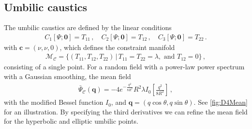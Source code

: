 \documentclass[a4paper, 11pt]{article}
\begin{document}
\subsection{Umbilic caustics}
The umbilic caustics are defined by the linear conditions 
\begin{align}
C_1[\Psi;\bm{0}] = T_{11}\,,\quad
C_2[\Psi;\bm{0}] = T_{12}\,,\quad
C_3[\Psi;\bm{0}] = T_{22}\,.
\end{align}
with $\bm{c}=(\nu,\nu,0)$, which defines the constraint manifold 
\begin{align}
\mathcal{M}_{\mathcal{C}} = \{(T_{11},T_{12},T_{22})\,|\, T_{11}=T_{22} = \lambda, \text{ and } T_{12}=0\}\,,
\end{align}
consisting of a single point. For a random field with a power-law power spectrum with a Gaussian smoothing, the mean field
\begin{align}
\bar{\Psi}_{\mathcal{C}}(\bm{q}) =-4 e^{-\frac{q^2}{8R^2}}R^2 \lambda I_0\left[\frac{q^2}{8R^2}\right]\,,
\end{align}
with the modified Bessel function $I_0$, and $\bm{q}=(q\cos\theta, q\sin \theta)$. See \ref{fig:D4Mean} for an illustration. By specifying the third derivatives we can refine the mean field for the hyperbolic and elliptic umbilic points.
\end{document}

